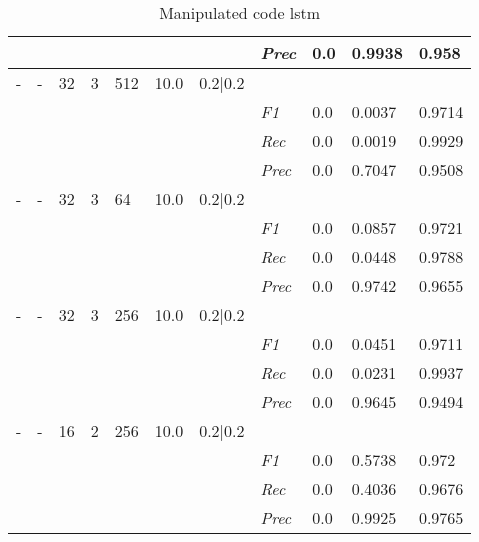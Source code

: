 \begin{table}[]
\begin{tabularx}{\textwidth}{XXXXXXX|X|X|X|X}
    & & & & & & & \textit{Prec} & 0.0 & 0.9938 & 0.958 \\ \midrule
    - & - & 32 & 3 & 512 &10.0 & 0.2|0.2 & & & & \\
    & & & & & & & \textit{F1} & 0.0 & 0.0037 & 0.9714       \\
    & & & & & & & \textit{Rec} &  0.0 & 0.0019  & 0.9929  \\
    & & & & & & & \textit{Prec} & 0.0 & 0.7047 & 0.9508 \\ \midrule
    - & - & 32 & 3 & 64 &10.0 & 0.2|0.2 & & & & \\
    & & & & & & & \textit{F1} & 0.0 & 0.0857 & 0.9721       \\
    & & & & & & & \textit{Rec} &  0.0 & 0.0448  & 0.9788  \\
    & & & & & & & \textit{Prec} & 0.0 & 0.9742 & 0.9655 \\ \midrule
    - & - & 32 & 3 & 256 &10.0 & 0.2|0.2 & & & & \\
    & & & & & & & \textit{F1} & 0.0 & 0.0451 & 0.9711       \\
    & & & & & & & \textit{Rec} &  0.0 & 0.0231  & 0.9937  \\
    & & & & & & & \textit{Prec} & 0.0 & 0.9645 & 0.9494 \\ \midrule
    - & - & 16 & 2 & 256 &10.0 & 0.2|0.2 & & & & \\
    & & & & & & & \textit{F1} & 0.0 & 0.5738 & 0.972       \\
    & & & & & & & \textit{Rec} &  0.0 & 0.4036  & 0.9676  \\
    & & & & & & & \textit{Prec} & 0.0 & 0.9925 & 0.9765 \\ \midrule
    \end{tabularx}
    \caption{Manipulated code lstm}
    \label{tab:rq3_lstm}
    \end{table}